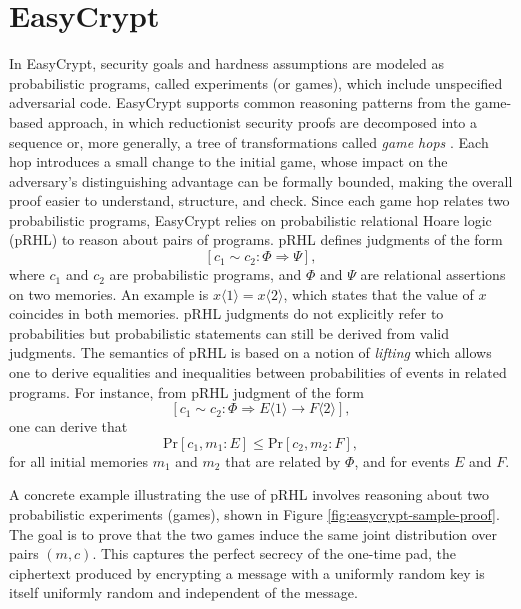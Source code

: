 \section{EasyCrypt}
In EasyCrypt, security goals and hardness assumptions are modeled as probabilistic programs, called experiments (or games), which include unspecified adversarial code. EasyCrypt supports common reasoning patterns from the game-based approach, in which reductionist security proofs are decomposed into a sequence or, more generally, a tree of transformations called \textit{game hops} \cite{the-game-playing-technique, a-tool-for-taming-complexity-in-security-proofs}. Each hop introduces a small change to the initial game, whose impact on the adversary's distinguishing advantage can be formally bounded, making the overall proof easier to understand, structure, and check. Since each game hop relates two probabilistic programs, EasyCrypt relies on probabilistic relational Hoare logic (pRHL) to reason about pairs of programs. pRHL defines judgments of the form
\[
[c_1 \sim c_2 : \Phi \Longrightarrow \Psi],
\]
where $c_1$ and $c_2$ are probabilistic programs, and $\Phi$ and $\Psi$ are relational assertions on two memories. An example is $x\langle1\rangle = x\langle2\rangle$, which states that the value of $x$ coincides in both memories. pRHL judgments do not explicitly refer to probabilities but probabilistic statements can still be derived from valid judgments. The semantics of pRHL is based on a notion of \textit{lifting} which allows one to derive equalities and inequalities between probabilities of events in related programs. For instance, from pRHL judgment of the form
\[
[c_1 \sim c_2 : \Phi \Longrightarrow E\langle1\rangle \to F\langle2\rangle],
\]
one can derive that
\[
\mathrm{Pr}[c_1, m_1: E] \leq \mathrm{Pr} [c_2, m_2: F ],
\]
for all initial memories $m_1$ and $m_2$ that are related by $\Phi$, and for events $E$ and $F$.

A concrete example illustrating the use of pRHL involves reasoning about two probabilistic experiments (games), shown in Figure \ref{fig:easycrypt-sample-proof}. The goal is to prove that the two games induce the same joint distribution over pairs $(m,c)$. This captures the perfect secrecy of the one-time pad, the ciphertext produced by encrypting a message with a uniformly random key is itself uniformly random and independent of the message. 

